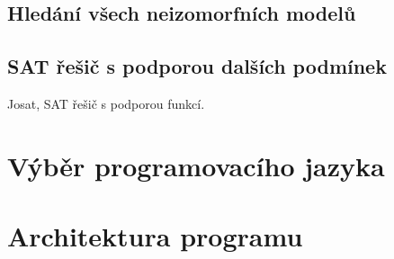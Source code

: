 \subsection{Hledání všech neizomorfních modelů}

\subsection{SAT řešič s podporou dalších podmínek}

Josat, SAT řešič s podporou funkcí.

\section{Výběr programovacího jazyka}

\section{Architektura programu}
